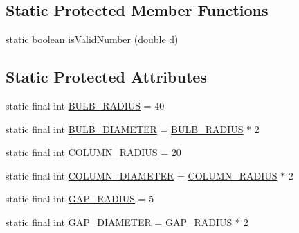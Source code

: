 \subsection*{Static Protected Member Functions}
\begin{DoxyCompactItemize}
\item 
static boolean \mbox{\hyperlink{classorg_1_1jfree_1_1chart_1_1plot_1_1_thermometer_plot_ae9e9203eee4b398bef09190f61f8a369}{is\+Valid\+Number}} (double d)
\end{DoxyCompactItemize}
\subsection*{Static Protected Attributes}
\begin{DoxyCompactItemize}
\item 
static final int \mbox{\hyperlink{classorg_1_1jfree_1_1chart_1_1plot_1_1_thermometer_plot_a083cb40ff73e7951a4496f7a6187c60c}{B\+U\+L\+B\+\_\+\+R\+A\+D\+I\+US}} = 40
\item 
static final int \mbox{\hyperlink{classorg_1_1jfree_1_1chart_1_1plot_1_1_thermometer_plot_adc9b029fb081ad0e5e24f0f27c6915d3}{B\+U\+L\+B\+\_\+\+D\+I\+A\+M\+E\+T\+ER}} = \mbox{\hyperlink{classorg_1_1jfree_1_1chart_1_1plot_1_1_thermometer_plot_a083cb40ff73e7951a4496f7a6187c60c}{B\+U\+L\+B\+\_\+\+R\+A\+D\+I\+US}} $\ast$ 2
\item 
static final int \mbox{\hyperlink{classorg_1_1jfree_1_1chart_1_1plot_1_1_thermometer_plot_a3418213a2ef914ddb65e6e815a926a20}{C\+O\+L\+U\+M\+N\+\_\+\+R\+A\+D\+I\+US}} = 20
\item 
static final int \mbox{\hyperlink{classorg_1_1jfree_1_1chart_1_1plot_1_1_thermometer_plot_a5b617112eb1108298beb71a3ad618dac}{C\+O\+L\+U\+M\+N\+\_\+\+D\+I\+A\+M\+E\+T\+ER}} = \mbox{\hyperlink{classorg_1_1jfree_1_1chart_1_1plot_1_1_thermometer_plot_a3418213a2ef914ddb65e6e815a926a20}{C\+O\+L\+U\+M\+N\+\_\+\+R\+A\+D\+I\+US}} $\ast$ 2
\item 
static final int \mbox{\hyperlink{classorg_1_1jfree_1_1chart_1_1plot_1_1_thermometer_plot_a6736ddb354286f1c4582e7395b311896}{G\+A\+P\+\_\+\+R\+A\+D\+I\+US}} = 5
\item 
static final int \mbox{\hyperlink{classorg_1_1jfree_1_1chart_1_1plot_1_1_thermometer_plot_a81f216575c6eabba626fb7d548104d55}{G\+A\+P\+\_\+\+D\+I\+A\+M\+E\+T\+ER}} = \mbox{\hyperlink{classorg_1_1jfree_1_1chart_1_1plot_1_1_thermometer_plot_a6736ddb354286f1c4582e7395b311896}{G\+A\+P\+\_\+\+R\+A\+D\+I\+US}} $\ast$ 2
\item 

\end{DoxyCompactItemize}
